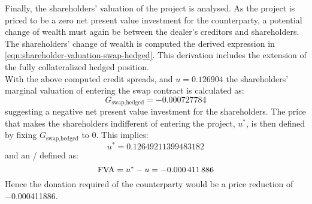 \documentclass[main.tex]{subfiles}
\begin{document}
            Finally, the shareholders' valuation of the project is analysed.
            As the project is priced to be a zero net present value investment for the counterparty,
            a potential change of wealth must again be between the dealer's creditors and shareholders.
            The shareholders' change of wealth is computed the derived expression in \cref{eqn:shareholder-valuation-swap-hedged}.
            This derivation includes the extension of the fully collateralized hedged position.
            \\
            With the above computed credit spreads, and $u=\num{0.126904}$
            the shareholders' marginal valuation of entering the swap contract is calculated as:
            \begin{equation}
                G_{\text{swap,hedged}} = \num{-0.000727784}
            \end{equation}
            suggesting a negative net present value investment for the shareholders. 
            The price that makes the shareholders indifferent of entering the project, $u^{\ast}$, is then defined by fixing $G_{\text{swap,hedged}}$ to 0.
            This implies:
            \begin{equation}
                u^{\ast} = \num{0.12649211399483182}
            \end{equation}
            and an \FVA/ defined as:
            \begin{equation}
                \FVA/ = u^{\ast} - u = \num{-0.000411886}
            \end{equation}
            Hence the donation required of the counterparty would be a price reduction of \num{-0.000411886}.
            
\end{document}
